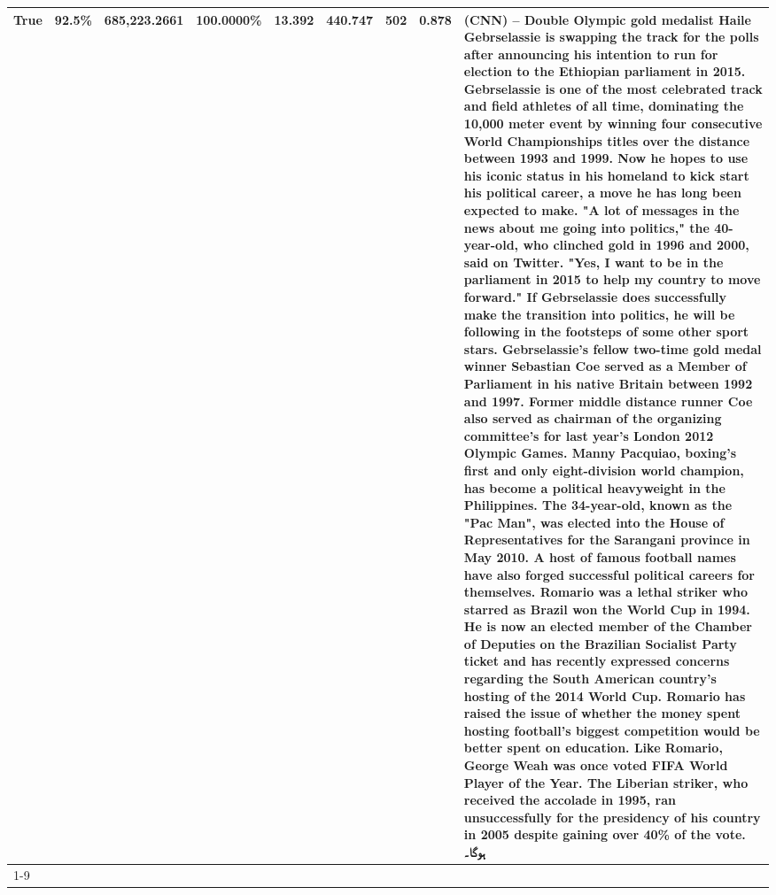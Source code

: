 \begin{table}[H]
{\begin{tabular}{lllrlllll}
True & 92.5\% & 685,223.2661 & \bfseries \color{red} 100.0000\% & 13.392 & 440.747 & 502 & 0.878 & (CNN) -- Double Olympic gold medalist Haile Gebrselassie is swapping the track for the polls after announcing his intention to run for election to the Ethiopian parliament in 2015. Gebrselassie is one of the most celebrated track and field athletes of all time, dominating the 10,000 meter event by winning four consecutive World Championships titles over the distance between 1993 and 1999. Now he hopes to use his iconic status in his homeland to kick start his political career, a move he has long been expected to make. "A lot of messages in the news about me going into politics," the 40-year-old, who clinched gold in 1996 and 2000, said on Twitter. "Yes, I want to be in the parliament in 2015 to help my country to move forward." If Gebrselassie does successfully make the transition into politics, he will be following in the footsteps of some other sport stars. Gebrselassie's fellow two-time gold medal winner Sebastian Coe served as a Member of Parliament in his native Britain between 1992 and 1997. Former middle distance runner Coe also served as chairman of the organizing committee's for last year's London 2012 Olympic Games. Manny Pacquiao, boxing's first and only eight-division world champion, has become a political heavyweight in the Philippines. The 34-year-old, known as the "Pac Man", was elected into the House of Representatives for the Sarangani province in May 2010. A host of famous football names have also forged successful political careers for themselves. Romario was a lethal striker who starred as Brazil won the World Cup in 1994. He is now an elected member of the Chamber of Deputies on the Brazilian Socialist Party ticket and has recently expressed concerns regarding the South American country's hosting of the 2014 World Cup. Romario has raised the issue of whether the money spent hosting football's biggest competition would be better spent on education. Like Romario, George Weah was once voted FIFA World Player of the Year. The Liberian striker, who received the accolade in 1995, ran unsuccessfully for the presidency of his country in 2005 despite gaining over 40\% of the vote. ہوگا۔ \\
\cline{1-9}

\end{tabular}}
\end{table}
